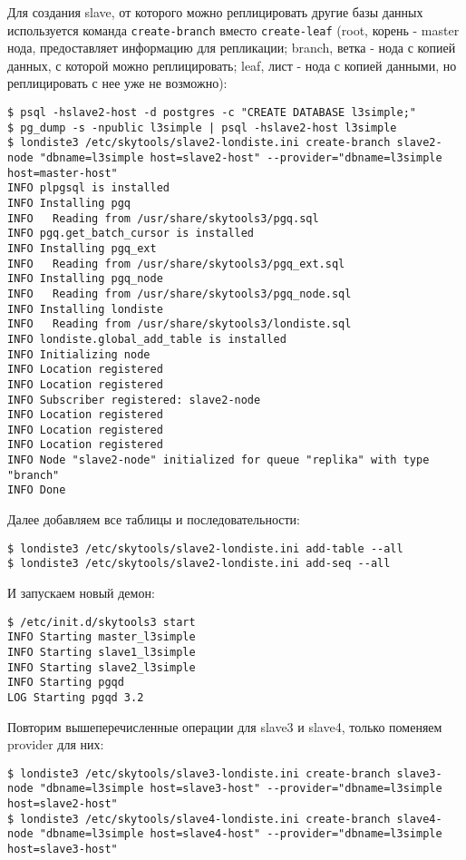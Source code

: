 Для создания slave, от которого можно реплицировать другие базы данных используется команда \lstinline!create-branch! вместо \lstinline!create-leaf! (root, корень - master нода, предоставляет информацию для репликации; branch, ветка - нода с копией данных, с которой можно реплицировать; leaf, лист - нода с копией данными, но реплицировать с нее уже не возможно):

\begin{lstlisting}[label=lst:londiste-cascade2,caption=Инициализируем slave2]
$ psql -hslave2-host -d postgres -c "CREATE DATABASE l3simple;"
$ pg_dump -s -npublic l3simple | psql -hslave2-host l3simple
$ londiste3 /etc/skytools/slave2-londiste.ini create-branch slave2-node "dbname=l3simple host=slave2-host" --provider="dbname=l3simple host=master-host"
INFO plpgsql is installed
INFO Installing pgq
INFO   Reading from /usr/share/skytools3/pgq.sql
INFO pgq.get_batch_cursor is installed
INFO Installing pgq_ext
INFO   Reading from /usr/share/skytools3/pgq_ext.sql
INFO Installing pgq_node
INFO   Reading from /usr/share/skytools3/pgq_node.sql
INFO Installing londiste
INFO   Reading from /usr/share/skytools3/londiste.sql
INFO londiste.global_add_table is installed
INFO Initializing node
INFO Location registered
INFO Location registered
INFO Subscriber registered: slave2-node
INFO Location registered
INFO Location registered
INFO Location registered
INFO Node "slave2-node" initialized for queue "replika" with type "branch"
INFO Done
\end{lstlisting}

Далее добавляем все таблицы и последовательности:

\begin{lstlisting}[label=lst:londiste-cascade3,caption=Инициализируем slave2]
$ londiste3 /etc/skytools/slave2-londiste.ini add-table --all
$ londiste3 /etc/skytools/slave2-londiste.ini add-seq --all
\end{lstlisting}

И запускаем новый демон:

\begin{lstlisting}[label=lst:londiste-cascade4,caption=Инициализируем slave2]
$ /etc/init.d/skytools3 start
INFO Starting master_l3simple
INFO Starting slave1_l3simple
INFO Starting slave2_l3simple
INFO Starting pgqd
LOG Starting pgqd 3.2
\end{lstlisting}

Повторим вышеперечисленные операции для slave3 и slave4, только поменяем provider для них:

\begin{lstlisting}[label=lst:londiste-cascade5,caption=Инициализируем slave3 и slave4]
$ londiste3 /etc/skytools/slave3-londiste.ini create-branch slave3-node "dbname=l3simple host=slave3-host" --provider="dbname=l3simple host=slave2-host"
$ londiste3 /etc/skytools/slave4-londiste.ini create-branch slave4-node "dbname=l3simple host=slave4-host" --provider="dbname=l3simple host=slave3-host"
\end{lstlisting}

